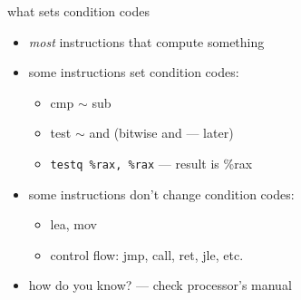 \begin{frame}[fragile,label=setCC]{what sets condition codes}
\begin{itemize}
\item \textit{most} instructions that compute something 
\item some instructions  set condition codes:
    \begin{itemize}
    \item {\keywordstyle cmp} $\sim$ {\keywordstyle sub}
    \item {\keywordstyle test} $\sim$ {\keywordstyle and} (bitwise and --- later)
    \item \lstinline|testq %rax, %rax| --- result is \%rax
    \end{itemize}
\item some instructions don't change condition codes:
    \begin{itemize}
    \item {\keywordstyle lea}, {\keywordstyle mov}
    \item control flow: {\keywordstyle jmp}, {\keywordstyle call}, {\keywordstyle ret}, {\keywordstyle jle}, etc.
    \end{itemize}
\item how do you know? --- check processor's manual
\end{itemize}
\end{frame}

